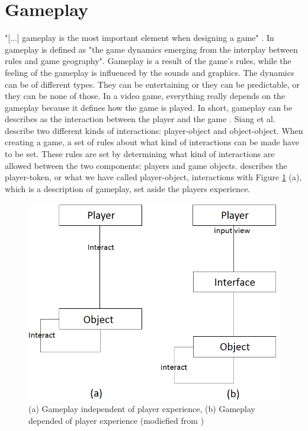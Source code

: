 \section{Gameplay}

"[...] gameplay is the most important element when designing a game" \cite{umlapproach}.  In \cite{understandingvg} gameplay is defined as "the game dynamics emerging from the interplay between rules and game geography". Gameplay is a result of the game's rules, while the feeling of the gameplay is influenced by the sounds and graphics. The dynamics can be of different types. They can be entertaining or they can be predictable, or they can be none of those. In a video game, everything really depends on the gameplay because it defines how the game is played. In short, gameplay can be describes as the interaction between the player and the game \cite{umlapproach}. Siang et al. describe two different kinds of interactions: player-object and object-object. When creating a game, a set of rules about what kind of interactions can be made have to be set. These rules are set by determining what kind of interactions are allowed between the two components: players and game objects. \cite{umlapproach} describes the player-token, or what we have called player-object, interactions with Figure \ref{fig:playerobject} (a), which is a description of gameplay, set aside the players experience.
\begin{figure}
\begin{center}
\includegraphics[scale=0.4]{player-object-merged}
\caption[The player-token interaction]{(a) Gameplay independent of player experience, (b) Gameplay depended of player experience (modiefied from \cite{umlapproach})}
\label{fig:playerobject}
\end{center}
\end{figure} 


